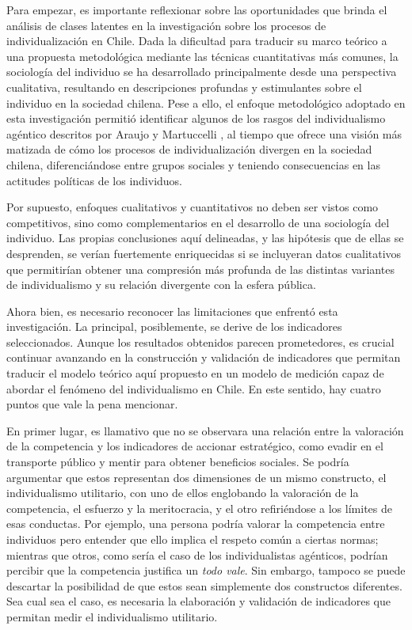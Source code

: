 \documentclass[12pt,twoside]{templates/facsothesis}
\begin{document}
Para empezar, es importante reflexionar sobre las oportunidades que brinda el análisis de clases latentes en la investigación sobre los procesos de individualización en Chile. Dada la dificultad para traducir su marco teórico a una propuesta metodológica mediante las técnicas cuantitativas más comunes, la sociología del individuo se ha desarrollado principalmente desde una perspectiva cualitativa, resultando en descripciones profundas y estimulantes sobre el individuo en la sociedad chilena. Pese a ello, el enfoque metodológico adoptado en esta investigación permitió identificar algunos de los rasgos del individualismo agéntico descritos por Araujo y Martuccelli \citeyearpar{araujo2014}, al tiempo que ofrece una visión más matizada de cómo los procesos de individualización divergen en la sociedad chilena, diferenciándose entre grupos sociales y teniendo consecuencias en las actitudes políticas de los individuos.

Por supuesto, enfoques cualitativos y cuantitativos no deben ser vistos como competitivos, sino como complementarios en el desarrollo de una sociología del individuo. Las propias conclusiones aquí delineadas, y las hipótesis que de ellas se desprenden, se verían fuertemente enriquecidas si se incluyeran datos cualitativos que permitirían obtener una compresión más profunda de las distintas variantes de individualismo y su relación divergente con la esfera pública.

Ahora bien, es necesario reconocer las limitaciones que enfrentó esta investigación. La principal, posiblemente, se derive de los indicadores seleccionados. Aunque los resultados obtenidos parecen prometedores, es crucial continuar avanzando en la construcción y validación de indicadores que permitan traducir el modelo teórico aquí propuesto en un modelo de medición capaz de abordar el fenómeno del individualismo en Chile. En este sentido, hay cuatro puntos que vale la pena mencionar.

En primer lugar, es llamativo que no se observara una relación entre la valoración de la competencia y los indicadores de accionar estratégico, como evadir en el transporte público y mentir para obtener beneficios sociales. Se podría argumentar que estos representan dos dimensiones de un mismo constructo, el individualismo utilitario, con uno de ellos englobando la valoración de la competencia, el esfuerzo y la meritocracia, y el otro refiriéndose a los límites de esas conductas. Por ejemplo, una persona podría valorar la competencia entre individuos pero entender que ello implica el respeto común a ciertas normas; mientras que otros, como sería el caso de los individualistas agénticos, podrían percibir que la competencia justifica un \emph{todo vale}. Sin embargo, tampoco se puede descartar la posibilidad de que estos sean simplemente dos constructos diferentes. Sea cual sea el caso, es necesaria la elaboración y validación de indicadores que permitan medir el individualismo utilitario.
\end{document}
